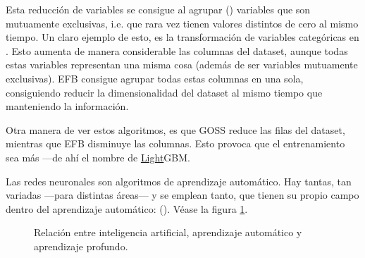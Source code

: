 \begin{itemize}
    Esta reducción de variables se consigue al agrupar () variables que son mutuamente exclusivas, i.e. que rara vez tienen valores distintos de cero al mismo tiempo. Un claro ejemplo de esto, es la transformación de variables categóricas en \fnm. Esto aumenta de manera considerable las columnas del dataset, aunque todas estas variables representan una misma cosa (además de  ser variables mutuamente exclusivas). EFB consigue agrupar todas estas columnas en una sola\fnm, consiguiendo reducir la dimensionalidad del dataset al mismo tiempo que manteniendo la información.
\end{itemize}
\addtocounter{footnote}{1}

Otra manera de ver estos algoritmos, es que GOSS reduce las filas del dataset, mientras que EFB disminuye las columnas. Esto provoca que el entrenamiento sea más  ---de ahí el nombre de \ul{Light}GBM.

\label{rrnn}

Las redes neuronales son algoritmos de aprendizaje automático. Hay tantas, tan variadas ---para distintas áreas--- y se emplean tanto, que tienen su propio campo dentro del aprendizaje automático:  (). Véase la figura \ref{IA}.
\begin{figure}[H]
    \centering
    \caption{Relación entre inteligencia artificial, aprendizaje automático y aprendizaje profundo.}
    \label{IA}
\end{figure}

